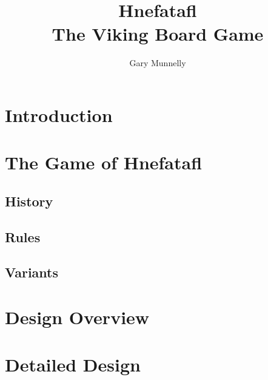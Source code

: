\documentclass[a4paper, 10pt, titlepage]{article}
\begin{document}
\title{Hnefatafl\\\large{The Viking Board Game}}
\author{Gary Munnelly}
\date{ }
\maketitle
{}
\tableofcontents
\newpage
{}
\section{Introduction}
\section{The Game of Hnefatafl}
\subsection{History}
\subsection{Rules}
\subsection{Variants}
\section{Design Overview}
\section{Detailed Design}
\end{document}
